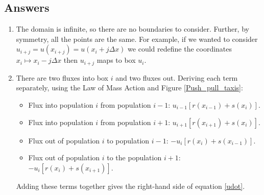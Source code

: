\documentclass[10pt]{article}
\newcommand{\fig}[1]{Figure \ref{#1}}
\newcommand{\eqn}[1]{equation \eqref{#1}}
\begin{document}
\begin{Answ}
\subsection{Answers}
\begin{enumerate}
\item The domain is infinite, so there are no boundaries to consider. Further, by symmetry, all the points are the same. For example, if we wanted to consider $u_{i+j}=u(x_{i+j})=u(x_{i}+j\Delta x)$ we could redefine the coordinates $x_i\mapsto x_i-j\Delta x$ then $u_{i+j}$ maps to box $u_i$.

\item There are two fluxes into box $i$ and two fluxes out. Deriving each term separately, using the Law of Mass Action and \fig{Push_pull_taxis}:
\begin{itemize}
\item Flux into population $i$ from population $i-1$: $u_{i-1}[r(x_{i-1})+s(x_i)]$.
\item Flux into population $i$ from population $i+1$: $u_{i+1}[r(x_{i+1})+s(x_i)]$.
\item Flux out of population $i$ to population $i-1$: $-u_{i}[r(x_{i})+s(x_{i-1})]$.
\item Flux out of population $i$ to the population $i+1$: $-u_{i}[r(x_{i})+s(x_{i+1})]$.
\end{itemize}
Adding these terms together gives the right-hand side of \eqn{udot}.



\end{enumerate}
\end{Answ}
\end{document}
